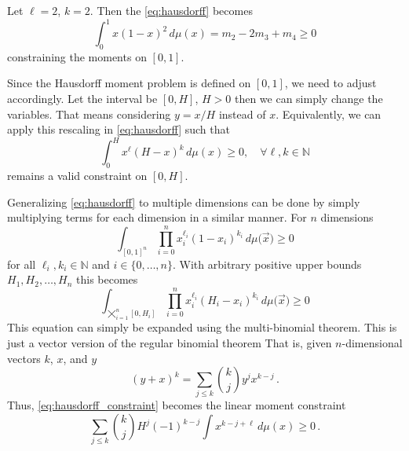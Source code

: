 \begin{example}
	Let $\ell = 2$, $k=2$. Then the \eqref{eq:hausdorff} becomes
	\[
		\int_0^1 x (1 - x)^2 \,d\mu(x) =
		m_2 - 2 m_3 + m_4 \geq 0
	\]
	constraining the moments on $[0,1]$.
\end{example}

Since the Hausdorff moment problem is defined on $[0,1]$, we need to adjust accordingly.
Let the interval be $[0,H]$, $H>0$ then we can simply change the variables.
That means considering $y=x/H$ instead of $x$.
Equivalently, we can apply this rescaling in \eqref{eq:hausdorff} such that
\begin{equation}\label{eq:hausdorff_scaled}
	\int_0^H x^\ell(H-x)^k\,d\mu(x) \geq 0, \quad \forall \ell, k\in\mathbb{N}
\end{equation}
remains a valid constraint on $[0,H]$.

Generalizing \eqref{eq:hausdorff} to multiple dimensions can be done by simply multiplying terms
for each dimension in a similar manner.
For $n$ dimensions
\begin{equation*}
	\int_{{[0,1]}^n}\prod_{i = 0}^n x_i^{\ell_i}{(1-x_i)}^{k_i}\,d\mu{(\vec{x}})\geq 0
\end{equation*}
for all $\ell_i, k_i\in\mathbb{N}$ and $i\in \{0,\dotsc, n\}$.
With arbitrary positive upper bounds $H_1, H_2, \dotsc, H_n$ this becomes
\begin{equation}\label{eq:hausdorff_constraint}
    \int_{\bigtimes_{i=1}^n[0,H_i]}\prod_{i = 0}^n x_i^{\ell_i}{(H_i-x_i)}^{k_i}\,d\mu{(\vec{x}})\geq 0
\end{equation}
This equation can simply be expanded using the multi-binomial theorem. %
This is just a vector version of the regular binomial theorem
That is, given $n$-dimensional vectors $k$, $x$, and $y$
\[
    (y+x)^{k} =
    \sum_{j\leq k}
    \binom{k}{j} y^{j}x^{k-j}\,.
\]
Thus, \eqref{eq:hausdorff_constraint} becomes the linear moment constraint
\begin{equation}\label{eq:hausdorff}
    \sum_{j\leq k}
    \binom{k}{j}
    H^j (-1)^{k-j}
    \int
    x^{k-j+\ell} \,d\mu(x)\geq 0\,.
\end{equation}

